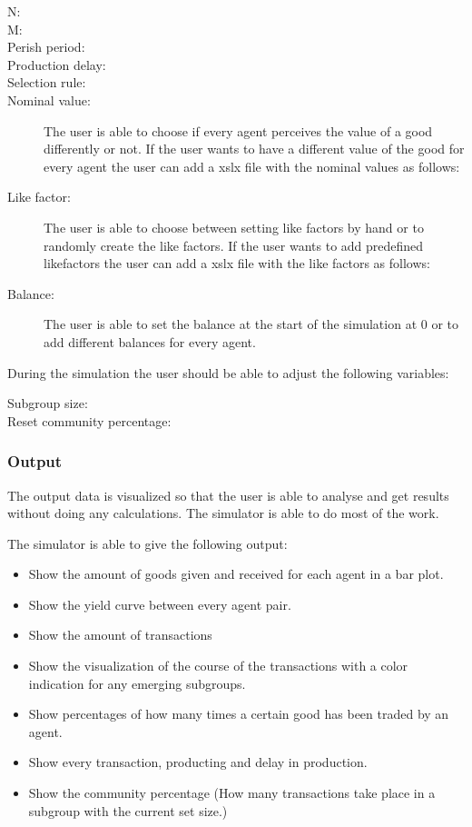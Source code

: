 \documentclass[twoside,openright]{uva-bachelor-thesis}
\begin{document}
\begin{description}
  \item[N:] 
  \item[M:] 
  \item[Perish period:] 
  \item[Production delay:]
 \item[Selection rule:] 
  \item[Nominal value:] The user is able to choose if every agent perceives the value of a good differently or not. If the user wants to have a different value of the good for every agent the user can add a xslx file with the nominal values as follows:
  \item[Like factor:] The user is able to choose between setting like factors by hand or to randomly create the like factors. If the user wants to add predefined likefactors the user can add a xslx file with the like factors as follows:
 \item[Balance:] The user is able to set the balance at the start of the simulation at 0 or to add different balances for every agent.
\end{description}
During the simulation the user should be able to adjust the following variables:

\begin{description}
  \item[Subgroup size:] 
  \item[Reset community percentage:] 

\end{description}
\subsubsection{Output}
The output data is visualized so that the user is able to analyse and get results without doing any calculations. The simulator is able to do most of the work.

The simulator is able to give the following output:
\begin{itemize}
  \item Show the amount of goods given and received for each agent in a bar plot.
  \item Show the yield curve between every agent pair.
  \item Show the amount of transactions
  \item Show the visualization of the course of the transactions with a color indication for any emerging subgroups.
  \item Show percentages of how many times a certain good has been traded by an agent.
  \item Show every transaction, producting and delay in production.
  \item Show the community percentage (How many transactions take place in a subgroup with the current set size.)
\end{itemize}
\end{document}
